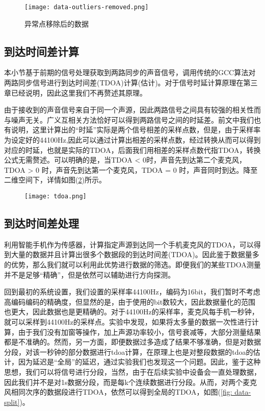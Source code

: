 \documentclass[winfonts]{njuthesis}
\begin{document}
			\begin{figure}[H]
				\centering
				\texttt{[image: data-outliers-removed.png]} 
				\caption{异常点移除后的数据}
				\label{fig: data-outliers-removed}
			\end{figure}
		
		\subsection{到达时间差计算}
			
			本小节基于前期的信号处理获取到两路同步的声音信号，调用传统的GCC算法对两路同步信号进行到达时间差(TDOA)计算(估计)。对于信号时延计算原理在第三章已经说明，因此这里我们不再赘述其原理。
			
			由于接收到的声音信号来自于同一个声源，因此两路信号之间具有较强的相关性而与噪声无关。广义互相关方法恰好可以得到两路信号之间的时延差。前文中我们也有说明，这里计算出的“时延”实际是两个信号相差的采样点数，但是，由于采样率为设定好的44100Hz,因此可以通过计算出相差的采样点数，经过转换从而可以得到对应的时延，也就是实际的TDOA，后面我们用相差的采样点数代指TDOA，转换公式无需赘述。可以明确的是，当TDOA < 0时，声音先到达第二个麦克风，TDOA > 0 时，声音先到达第一个麦克风，TDOA = 0 时，声音同时到达。降至二维空间下，详情如图(\ref{fig: tdoa})所示。
			
			\begin{figure}[H]
				\centering
				\texttt{[image: tdoa.png]} 
				\caption{{}}
				\label{fig: tdoa}
			\end{figure}
		
		\subsection{到达时间差处理}
		
		利用智能手机作为传感器，计算指定声源到达同一个手机麦克风的TDOA，可以得到大量的数据并且计算出很多个数据段的到达时间差(TDOA)。因此鉴于数据量多的优势，那么我们就可以利用此优势进行数据的筛选。即便我们的某些TDOA测量并不是足够“精确”，但是依然可以辅助进行方向探测。
		
		回到最初的系统设置，我们设置的采样率44100Hz，编码为16bit，我们暂时不考虑高编码编码的精确度，但显然的是，由于使用的bit数较大，因此数据量化的范围也更大，因此数据也是更精确的。对于44100Hz的采样率，麦克风每手机一秒钟，就可以采样到44100Hz的采样点。实验中发现，如果将太多量的数据一次性进行计算，由于我们没有加窗等操作，加上声源功率较小，信号衰减等，大部分测量结果都是不准确的。然而，另一方面，即便数据过多造成了结果不够准确，但是对数据分段，对该一秒钟的部分数据进行tdoa计算，在原理上也是对整段数据的tdoa的估计，因为延迟是“全局”的延迟，通过实验我们也发现这一个问题。因此，鉴于这种思想，我们可以将信号进行分段，当然，由于在后续实验中设备会一直处理数据，因此我们并不是对1s数据分段，而是每k个连续数据进行分段。从而，对两个麦克风相同次序的数据段进行TDOA，依然可以得到全局的TDOA，如图(\ref{fig: data-split})。
		
\end{document}

